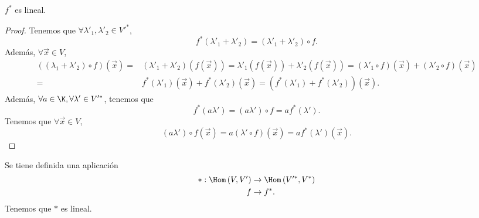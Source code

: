 \begin{fprop}[]
\normalfont $\displaystyle f^{*} $ es lineal.
\end{fprop}

\begin{proof}
Tenemos que $\displaystyle \forall \lambda'_{1}, \lambda'_{2} \in V'^{*} $, 
\[f^{*}\left(\lambda'_{1} + \lambda'_{2}\right) = \left(\lambda'_{1} + \lambda'_{2}\right) \circ f .\]
Además, $\displaystyle \forall\vec{x} \in V $,
\[
\begin{split}
	\left(\left(\lambda_{1}+\lambda'_{2}\right)\circ f\right)\left(\vec{x}\right) = & \left(\lambda'_{1}+\lambda'_{2}\right)\left(f\left(\vec{x}\right)\right) = \lambda'_{1}\left(f\left(\vec{x}\right)\right) + \lambda'_{2}\left(f\left(\vec{x}\right)\right) = \left(\lambda'_{1}\circ f\right)\left(\vec{x}\right) + \left(\lambda'_{2}\circ f\right)\left(\vec{x}\right) \\
	= & f^{*}\left(\lambda'_{1}\right)\left(\vec{x}\right) + f^{*}\left(\lambda'_{2}\right)\left(\vec{x}\right) = \left(f^{*}\left(\lambda'_{1}\right)+f^{*}\left(\lambda'_{2}\right)\right)\left(\vec{x}\right) .
\end{split}
\]
Además, $\displaystyle \forall a \in \K, \forall \lambda'\in V'^{*} $, tenemos que 
\[f^{*}\left(a\lambda'\right) = \left(a\lambda'\right) \circ f = a f^{*}\left(\lambda'\right) .\]
Tenemos que $\displaystyle \forall \vec{x}\in V $, 
\[\left(a\lambda'\right) \circ f\left(\vec{x}\right) = a\left(\lambda' \circ f\right)\left(\vec{x}\right) = a f^{*}\left(\lambda'\right)\left(\vec{x}\right) .\]
\end{proof}

\begin{ftheorem}[]
\normalfont Se tiene definida una aplicación
\[
\begin{split}
	* :  \Hom\left(V, V'\right) & \to \Hom\left(V'^{*}, V^{*}\right)\\
	f & \to f^{*}.
\end{split}
\]
Tenemos que $\displaystyle * $ es lineal.
\end{ftheorem}


